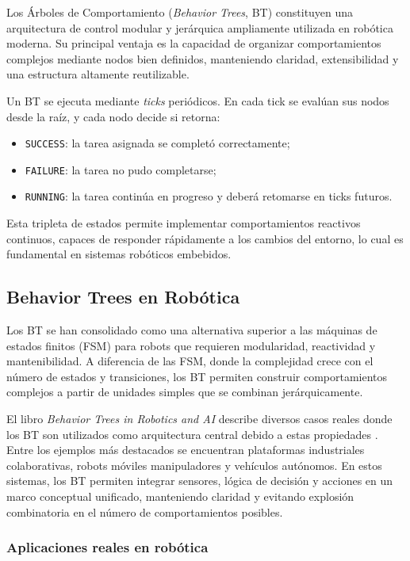\documentclass{prgrado}
\begin{document}
Los Árboles de Comportamiento (\emph{Behavior Trees}, BT) constituyen una arquitectura de control modular y jerárquica ampliamente utilizada en robótica moderna. Su principal ventaja es la capacidad de organizar comportamientos complejos mediante nodos bien definidos, manteniendo claridad, extensibilidad y una estructura altamente reutilizable.

Un BT se ejecuta mediante \emph{ticks} periódicos. En cada tick se evalúan sus nodos desde la raíz, y cada nodo decide si retorna:

\begin{itemize}
    \item \texttt{SUCCESS}: la tarea asignada se completó correctamente;
    \item \texttt{FAILURE}: la tarea no pudo completarse;
    \item \texttt{RUNNING}: la tarea continúa en progreso y deberá retomarse en ticks futuros.
\end{itemize}

Esta tripleta de estados permite implementar comportamientos reactivos continuos, capaces de responder rápidamente a los cambios del entorno, lo cual es fundamental en sistemas robóticos embebidos.

\subsection{Behavior Trees en Robótica}

Los BT se han consolidado como una alternativa superior a las máquinas de estados finitos (FSM) para robots que requieren modularidad, reactividad y mantenibilidad. A diferencia de las FSM, donde la complejidad crece con el número de estados y transiciones, los BT permiten construir comportamientos complejos a partir de unidades simples que se combinan jerárquicamente.

El libro \emph{Behavior Trees in Robotics and AI} describe diversos casos reales donde los BT son utilizados como arquitectura central debido a estas propiedades \cite{colledanchise2018bt}.  Entre los ejemplos más destacados se encuentran plataformas industriales colaborativas, robots móviles manipuladores y vehículos autónomos. En estos sistemas, los BT permiten integrar sensores, lógica de decisión y acciones en un marco conceptual unificado, manteniendo claridad y evitando explosión combinatoria en el número de comportamientos posibles.

\subsubsection{Aplicaciones reales en robótica}
\end{document}

